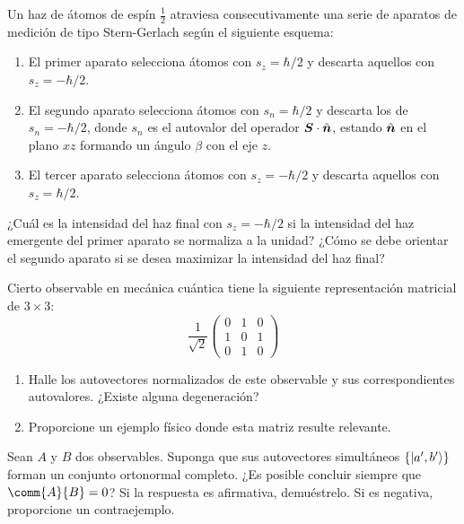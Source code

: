 \begin{enunciado}
Un haz de átomos de espín $\frac{1}{2}$ atraviesa consecutivamente una serie de aparatos de medición de tipo Stern-Gerlach según el siguiente esquema:
\begin{enumerate}
  \item El primer aparato selecciona átomos con $s_z = \hbar/2$ y descarta aquellos con $s_z = -\hbar/2$.
  \item El segundo aparato selecciona átomos con $s_n = \hbar/2$ y descarta los de $s_n = -\hbar/2$, donde $s_n$ es el autovalor del operador $\bm{S} \cdot \hat{\bm{n}}$, estando $\hat{\bm{n}}$ en el plano $xz$ formando un ángulo $\beta$ con el eje $z$.
  \item El tercer aparato selecciona átomos con $s_z = -\hbar/2$ y descarta aquellos con $s_z = \hbar/2$.
\end{enumerate}
¿Cuál es la intensidad del haz final con $s_z = -\hbar/2$ si la intensidad del haz emergente del primer aparato se normaliza a la unidad? ¿Cómo se debe orientar el segundo aparato si se desea maximizar la intensidad del haz final?
\end{enunciado}

\begin{enunciado}
Cierto observable en mecánica cuántica tiene la siguiente representación matricial de $3 \times 3$:
\[
\frac{1}{\sqrt{2}}
\begin{pmatrix}
0 & 1 & 0 \\
1 & 0 & 1 \\
0 & 1 & 0
\end{pmatrix}
\]
\begin{enumerate}
  \item Halle los autovectores normalizados de este observable y sus correspondientes autovalores. ¿Existe alguna degeneración?
  \item Proporcione un ejemplo físico donde esta matriz resulte relevante.
\end{enumerate}
\end{enunciado}

\begin{enunciado}
Sean $A$ y $B$ dos observables. Suponga que sus autovectores simultáneos $\{\lvert a', b'\rangle\}$ forman un conjunto ortonormal completo. ¿Es posible concluir siempre que $\comm{A}{B} = 0$? Si la respuesta es afirmativa, demuéstrelo. Si es negativa, proporcione un contraejemplo.
\end{enunciado}